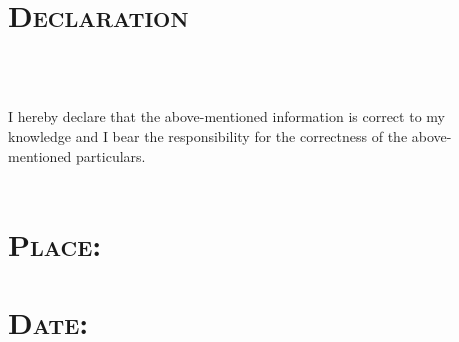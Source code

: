 \begin{resume}
\dates{}
\begin{position}
\end{position}

\section{\textsc{Declaration}}

\begin{formatb}
  \\
  \body\\
\end{formatb}

I hereby declare that the above-mentioned information is
  correct to my knowledge and I bear the responsibility for the
  correctness of the above-mentioned particulars. \\\\

\section{\textsc{Place}:}

\section{\textsc{Date}:}
\begin{formatb}
  \\
  \body\\
\end{formatb}
\employer{}
\begin{position}
\end{position}

\end{resume}

